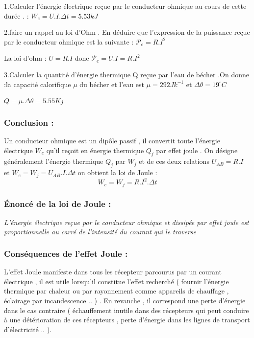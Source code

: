 \documentclass[12pt]{article}
\begin{document}
1.Calculer l’énergie électrique reçue par le conducteur
ohmique au cours de cette durée . : $W_e = U.I.\Delta{t} = 5.53kJ$

2.faire un rappel au loi d’Ohm . En déduire que l’expression
de la puissance reçue par le conducteur ohmique est la
suivante : $\mathscr{P}_e = R.I^2$

La loi d’ohm : $U=R.I$ donc $\mathscr{P}_e = U.I=R.I^2$

3.Calculer la quantité d’énergie thermique Q reçue par l’eau
de bécher .On donne :la capacité calorifique $\mu$ du bécher et l’eau est $\mu = 292Jk^{-1}$ et $\Delta{\theta} = 19^{\circ}C$

$ Q = \mu.\Delta{\theta} = 5.55Kj$

\subsubsection{Conclusion : }
Un conducteur ohmique est un dipôle passif  , il convertit toute
l’énergie électrique $W_e$ qu’il reçoit en énergie thermique $Q_j$ par
effet joule .
On désigne généralement l’énergie thermique $Q_j$ par $W_j$
et de ces deux relations $U_{AB} = R.I$ et $W_e = W_j = U_{AB}.I.\Delta{t}$ on
obtient la loi de Joule :
$$W_e = W_j = R.I^2.\Delta{t}$$

\subsubsection{Énoncé de la loi de Joule : }
\begin{tcolorbox}
\em{L’énergie électrique reçue par le conducteur ohmique et dissipée
par effet joule est proportionnelle au carré de l’intensité du
courant qui le traverse}
\end{tcolorbox}
\subsubsection{Conséquences de l’effet Joule : }
\begin{tcolorbox}
  L’effet Joule manifeste dans tous les récepteur parcourus par un
courant électrique , il est utile lorsqu’il constitue l’effet recherché (
fournir l’énergie thermique par chaleur ou par rayonnement
comme appareils de chauffage , éclairage par incandescence .. ) .
En revanche , il correspond une perte d’énergie dans le cas
contraire ( échauffement inutile dans des récepteurs qui peut
conduire à une détérioration de ces récepteurs , perte d’énergie
dans les lignes de transport d’électricité .. ).
\end{tcolorbox}
\end{document}
